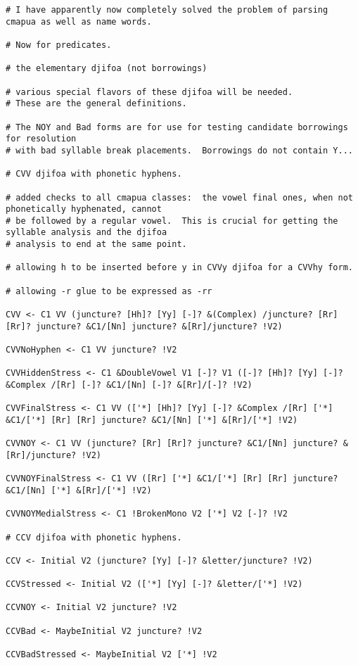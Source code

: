 \documentclass[12pt]{book}
\begin{document}
{\begin{verbatim}
# I have apparently now completely solved the problem of parsing cmapua as well as name words.

# Now for predicates.

# the elementary djifoa (not borrowings)

# various special flavors of these djifoa will be needed.
# These are the general definitions.

# The NOY and Bad forms are for use for testing candidate borrowings for resolution
# with bad syllable break placements.  Borrowings do not contain Y...

# CVV djifoa with phonetic hyphens.

# added checks to all cmapua classes:  the vowel final ones, when not phonetically hyphenated, cannot
# be followed by a regular vowel.  This is crucial for getting the syllable analysis and the djifoa
# analysis to end at the same point.

# allowing h to be inserted before y in CVVy djifoa for a CVVhy form.

# allowing -r glue to be expressed as -rr

CVV <- C1 VV (juncture? [Hh]? [Yy] [-]? &(Complex) /juncture? [Rr] [Rr]? juncture? &C1/[Nn] juncture? &[Rr]/juncture? !V2)

CVVNoHyphen <- C1 VV juncture? !V2

CVVHiddenStress <- C1 &DoubleVowel V1 [-]? V1 ([-]? [Hh]? [Yy] [-]? &Complex /[Rr] [-]? &C1/[Nn] [-]? &[Rr]/[-]? !V2)

CVVFinalStress <- C1 VV (['*] [Hh]? [Yy] [-]? &Complex /[Rr] ['*] &C1/['*] [Rr] [Rr] juncture? &C1/[Nn] ['*] &[Rr]/['*] !V2)

CVVNOY <- C1 VV (juncture? [Rr] [Rr]? juncture? &C1/[Nn] juncture? &[Rr]/juncture? !V2) 

CVVNOYFinalStress <- C1 VV ([Rr] ['*] &C1/['*] [Rr] [Rr] juncture? &C1/[Nn] ['*] &[Rr]/['*] !V2)

CVVNOYMedialStress <- C1 !BrokenMono V2 ['*] V2 [-]? !V2

# CCV djifoa with phonetic hyphens.

CCV <- Initial V2 (juncture? [Yy] [-]? &letter/juncture? !V2)

CCVStressed <- Initial V2 (['*] [Yy] [-]? &letter/['*] !V2)

CCVNOY <- Initial V2 juncture? !V2

CCVBad <- MaybeInitial V2 juncture? !V2

CCVBadStressed <- MaybeInitial V2 ['*] !V2



\end{verbatim}}
\end{document}
